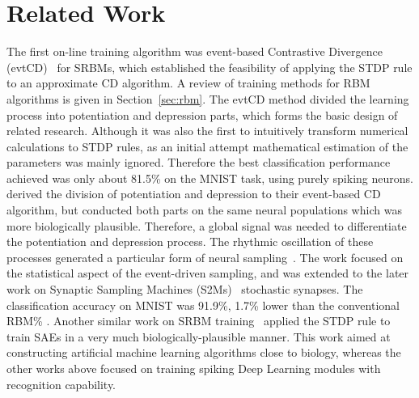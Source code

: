 \section{Related Work}
\label{sec:SRM_related}
The first on-line training algorithm \DIFdelbegin {}\DIFdelend \DIFaddbegin {}\DIFaddend was event-based Contrastive Divergence (evtCD)~\citep{neil2013online} for SRBMs, which established the feasibility of applying the STDP rule to an approximate CD algorithm.
A review of training methods for RBM algorithms is given in Section~\ref{sec:rbm}.
The evtCD method divided the learning process into potentiation and depression parts, which forms the basic design of related research.
Although it was also the first to intuitively transform numerical calculations to STDP rules, as an initial attempt mathematical estimation of the parameters was mainly ignored.
Therefore the best classification performance achieved was only about 81.5\% on the MNIST task, using purely spiking neurons.
\citet{neftci2013event} derived the division of potentiation and depression to their event-based CD algorithm, but conducted both parts on the same neural populations which was more biologically plausible.
Therefore, a global signal was needed to differentiate the potentiation and depression process.
The rhythmic oscillation of these processes generated a particular form of neural sampling~\citep{petrovici2013stochastic}.
The work focused on the statistical aspect of the event-driven sampling, and was extended to the later work on Synaptic Sampling Machines (S2Ms)~\citep{neftci2016stochastic} \DIFdelbegin {}\DIFdelend \DIFaddbegin {}\DIFaddend stochastic synapses.
The classification accuracy on MNIST was 91.9\%, 1.7\% lower than the conventional RBM\DIFaddbegin {}\% \DIFaddend .
Another similar work on SRBM training~\citep{burbank2015mirrored} applied the STDP rule to train SAEs in a very much biologically-plausible manner.
This work aimed at constructing artificial machine learning algorithms close to biology, whereas the other works above focused on training spiking Deep Learning modules with recognition capability\DIFdelbegin {}\DIFdelend .

